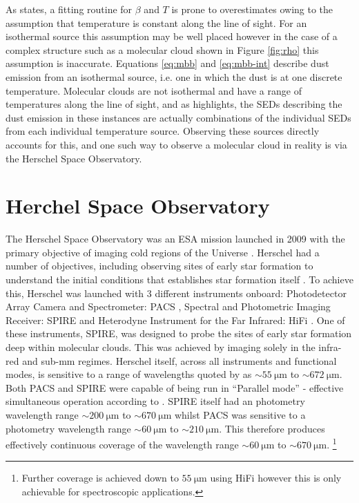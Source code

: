 \documentclass{report}
\begin{document}
As \textcite{noise} states, a fitting routine for $\beta$ and $T$ is prone to overestimates owing to the assumption that temperature is constant along the line of sight. For an isothermal source this assumption may be well placed however in the case of a complex structure such as a molecular cloud shown in Figure \ref{fig:rho} this assumption is inaccurate. Equations \ref{eq:mbb} and \ref{eq:mbb-int} describe dust emission from an isothermal source, i.e. one in which the dust is at one discrete temperature. Molecular clouds are not isothermal and have a range of temperatures along the line of sight, and as \textcite{noise} highlights, the SEDs describing the dust emission in these instances are actually combinations of the individual SEDs from each individual temperature source. Observing these sources directly accounts for this, and one such way to observe a molecular cloud in reality is via the Herschel Space Observatory.

\section{Herchel Space Observatory}
The Herschel Space Observatory was an ESA mission launched in 2009 with the primary objective of imaging cold regions of the Universe \parencite{herschel,fact}. Herschel had a number of objectives, including observing sites of early star formation to understand the initial conditions that establishes star formation itself \parencite{fact}. To achieve this, Herschel was launched with 3 different instruments onboard: Photodetector Array Camera and Spectrometer: PACS \parencite{PACS}, Spectral and Photometric Imaging Receiver: SPIRE \parencite{SPIRE} and Heterodyne Instrument for the Far Infrared: HiFi \parencite{HiFi}. One of these instruments, SPIRE, was designed to probe the sites of early star formation deep within molecular clouds. This was achieved by imaging solely in the infra-red and sub-mm regimes. Herschel itself, across all instruments and functional modes, is sensitive to a range of wavelengths quoted by \textcite{herschel} as $\sim \SI{55}{\micro\meter}$ to $\sim \SI{672}{\micro\meter}$. Both PACS and SPIRE were capable of being run in ``Parallel mode'' - effective simultaneous operation according to \textcite{herschel}. SPIRE itself had an photometry wavelength range
$\sim \SI{200}{\micro\meter}$ to $\sim \SI{670}{\micro\meter}$ whilst PACS was sensitive to a photometry wavelength range $\sim \SI{60}{\micro\meter}$ to $\sim \SI{210}{\micro\meter}$. This therefore produces effectively continuous coverage of the wavelength range $\sim \SI{60}{\micro\meter}$ to $\sim \SI{670}{\micro\meter}$.
\footnote{Further coverage is achieved down to $\SI{55}{\micro\meter}$ using HiFi however this is only achievable for spectroscopic applications.}
\end{document}
